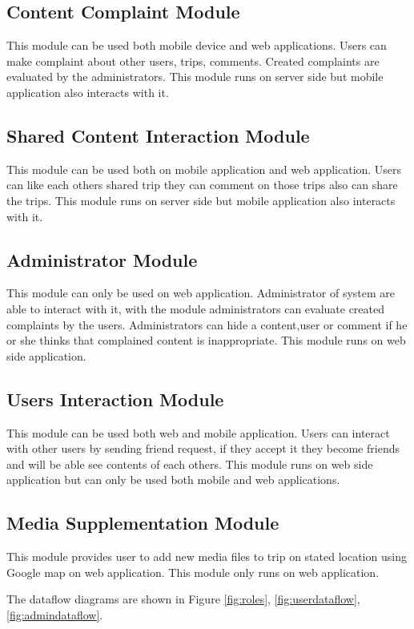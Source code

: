 \subsection{Content Complaint Module}   
This module can be used both mobile device and web applications. Users can make complaint about other users, trips, comments. Created complaints are evaluated by the administrators. This module runs on server side but mobile application also interacts with it.
    
\subsection{Shared Content Interaction Module}    
This module can be used both on mobile application and web application. Users can like each others shared trip they can comment on those trips also can share the trips. This module runs on server side but mobile application also interacts with it.

\subsection{Administrator Module}
This module can only be used on web application. Administrator of system are able to interact with it, with the module administrators can evaluate created complaints by the users. Administrators can hide a content,user or comment if he or she thinks that complained content is inappropriate. This module runs on web side application.

\subsection{Users Interaction Module}
This module can be used both web and mobile application. Users can interact with other users by sending friend request, if they accept it they become friends and will be able see contents of each others. This module runs on web side application but can only be used both mobile and web applications.

\subsection{Media Supplementation Module}
This module provides user to add new media files to trip on stated location using Google map on web application. This module only runs on web application.


The dataflow diagrams are shown in Figure \ref{fig:roles}, \ref{fig:userdataflow}, \ref{fig:admindataflow}.


